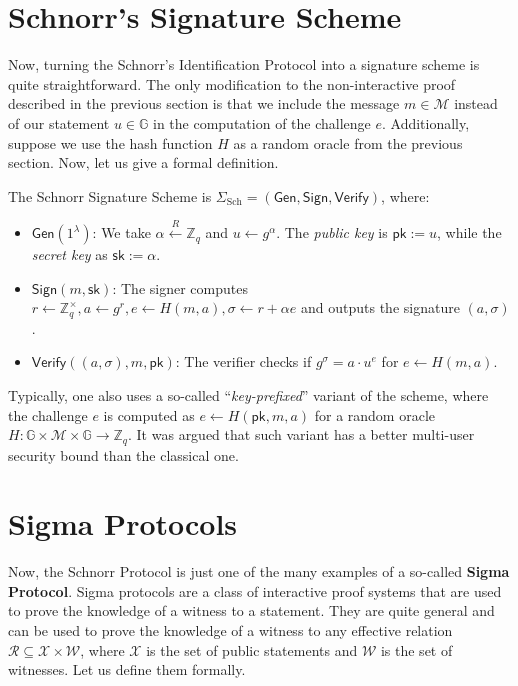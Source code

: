 \documentclass[../lecture-notes.tex]{subfiles}
\begin{document}
\section{Schnorr's Signature Scheme}

Now, turning the Schnorr's Identification Protocol into a signature scheme is quite straightforward. The only modification to the non-interactive proof described in the previous section is that we include the message $m \in \mathcal{M}$ instead of our statement $u \in \mathbb{G}$ in the computation of the challenge $e$. Additionally, suppose we use the hash function $H$ as a random oracle from the previous section. Now, let us give a formal definition.

\begin{definition}
    The Schnorr Signature Scheme is $\Sigma_{\text{Sch}} = (\mathsf{Gen}, \mathsf{Sign}, \mathsf{Verify})$, where:
    \begin{itemize}
        \item $\mathsf{Gen}(1^{\lambda})$: We take $\alpha \xleftarrow{R} \mathbb{Z}_q$ and $u \gets g^{\alpha}$. The \textit{public key} is $\mathsf{pk} := u$, while the \textit{secret key} as $\mathsf{sk} := \alpha$.
        \item $\mathsf{Sign}(m,\mathsf{sk})$: The signer computes $r \gets \mathbb{Z}_q^{\times}, a \gets g^{r}, e \gets H(m, a), \sigma \gets r + \alpha e$ and outputs the signature $(a,\sigma)$.
        \item $\mathsf{Verify}((a, \sigma), m,\mathsf{pk})$: The verifier checks if $g^{\sigma} = a \cdot u^e$ for $e \gets H(m, a)$.
    \end{itemize}
\end{definition}

\begin{remark}
    Typically, one also uses a so-called ``\textit{key-prefixed}'' variant of the scheme, where the challenge $e$ is computed as $e \gets H(\mathsf{pk}, m, a)$ for a random oracle $H: \mathbb{G} \times \mathcal{M} \times \mathbb{G} \to \mathbb{Z}_q$. It was argued that such variant has a better multi-user security bound than the classical one.
\end{remark}

\section{Sigma Protocols}

Now, the Schnorr Protocol is just one of the many examples of a so-called \textbf{Sigma Protocol}. Sigma protocols are a class of interactive proof systems that are used to prove the knowledge of a witness to a statement. They are quite general and can be used to prove the knowledge of a witness to any effective relation $\mathcal{R} \subseteq \mathcal{X} \times \mathcal{W}$, where $\mathcal{X}$ is the set of public statements and $\mathcal{W}$ is the set of witnesses. Let us define them formally.
\end{document}

